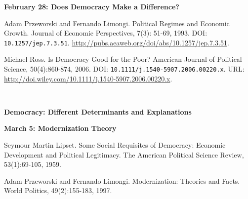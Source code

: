 \documentclass[letterpaper]{article}
\renewenvironment{itemize}{
  \begin{list}{}{
    \setlength{\leftmargin}{1.5em}
  }
}{
  \end{list}
}
\begin{document}
\begin{enumerate}
	\begin{itemize} 
		\item {\bf February 28: Does Democracy Make a Difference?}
			\begin{itemize} 
				\item[$\bullet$] Adam Przeworski and Fernando Limongi. Political Regimes and Economic Growth. Journal of Economic Perspectives, 7(3): 51-69, 1993. DOI: \texttt{10.1257/jep.7.3.51}. \url{http://pubs.aeaweb.org/doi/abs/10.1257/jep.7.3.51}.
				\item[$\bullet$] Michael Ross. Is Democracy Good for the Poor? American Journal of Political Science, 50(4):860-874,  2006. DOI: \texttt{10.1111/j.1540-5907.2006.00220.x}. URL: \url{http://doi.wiley.com/10.1111/j.1540-5907.2006.00220.x}.
			\end{itemize}
	\end{itemize}


\vspace{2mm}\\
\vspace{2mm}


\item {\bf Democracy: Different Determinants and Explanations}
	\begin{itemize} {\bf March 5: Modernization Theory}
				\begin{itemize}
					\item[$\bullet$] Seymour Martin Lipset. Some Social Requisites of Democracy: Economic Development and Political Legitimacy. The American Political Science Review, 53(1):69-105, 1959.
					\item[$\bullet$] Adam Przeworski and Fernando Limongi. Modernization: Theories and Facts. World Politics, 49(2):155-183, 1997.
				\end{itemize}


\end{itemize}
\end{enumerate}
\end{document}

